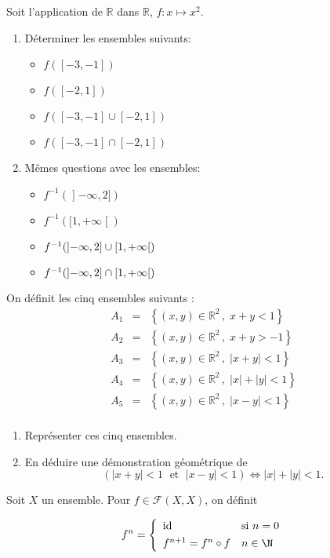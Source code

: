 \documentclass[10pt, a4paper, twocolumn]{homework}
\begin{document}
\exercice
Soit l'application de $\mathbb{R}$ dans $\mathbb{R}$, 
$f\colon x\mapsto x^2$.
\begin{enumerate}
\item Déterminer les ensembles suivants:
  \begin{itemize}
    \item $f([-3,-1])$
    \item $f([-2,1])$
    \item $f([-3,-1]\cup[-2,1])$
    \item $f([-3,-1]\cap[-2,1])$
  \end{itemize}
   
\item Mêmes questions avec les ensembles:
  \begin{itemize}
    \item $f^{-1}(\mathopen]-\infty,2])$
    \item $f^{-1}([1,+\infty\mathclose[)$
    \item $f^{-1}(\mathopen]-\infty,2]\cup\nolinebreak{}[1,+\infty\mathclose[)$
    \item $f^{-1}(\mathopen]-\infty,2]\cap\nolinebreak{}[1,+\infty\mathclose[)$
  \end{itemize}
\end{enumerate}
\exercice
On définit les cinq ensembles suivants :
\begin{eqnarray*}
A_1 & = & \left\{(x,y)\in\mathbb{R}^2\,,\; x+y<1\right\}\\
A_2 & = & \left\{(x,y)\in\mathbb{R}^2\,,\; x+y>-1\right\}\\
A_3 & = & \left\{(x,y)\in\mathbb{R}^2\,,\; |x+y|<1\right\}\\
A_4 & = & \left\{(x,y)\in\mathbb{R}^2\,,\; |x|+|y|<1\right\}\\
A_5 & = & \left\{(x,y)\in\mathbb{R}^2\,,\; |x-y|<1\right\}\\
\end{eqnarray*}

\begin{enumerate}
\item Représenter ces cinq ensembles.
\item En déduire une démonstration géométrique de
$$(|x+y|<1\;\mbox{ et }\;|x-y|<1) \Leftrightarrow |x|+|y|<1.$$
\end{enumerate}
\exercice 
Soit $X$ un ensemble. Pour $f \in \mathcal{F} (X, X)$, on d\'efinit


\begin{equation*}
  f^{n} = \left\{
    \begin{array}{ll}
      \text{id} & \text{si } n=0\\[4pt]
      f^{n+1} = f^n \circ f & n \in \N
    \end{array}
  \right.
\end{equation*}
\end{document}
